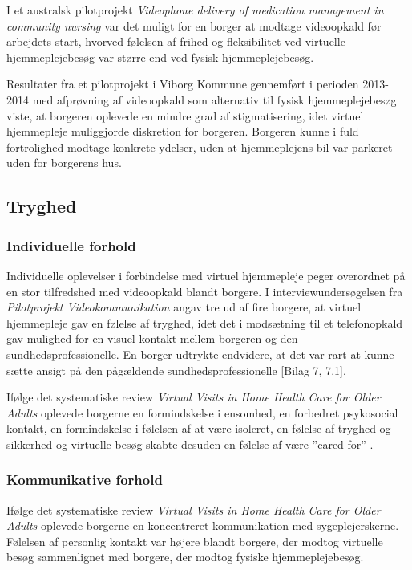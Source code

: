 I et australsk pilotprojekt \textit{Videophone delivery of medication management in community nursing} var det muligt for en borger at modtage videoopkald før arbejdets start, hvorved følelsen af frihed og fleksibilitet ved virtuelle hjemmeplejebesøg var større end ved fysisk hjemmeplejebesøg\cite{wade}.
 
Resultater fra et pilotprojekt i Viborg Kommune gennemført i perioden 2013-2014 med afprøvning af videoopkald som alternativ til fysisk hjemmeplejebesøg viste, at borgeren oplevede en mindre grad af stigmatisering, idet virtuel hjemmepleje muliggjorde diskretion for borgeren. Borgeren kunne i fuld fortrolighed modtage konkrete ydelser, uden at hjemmeplejens bil var parkeret uden for borgerens hus\cite{kandidat}.

\subsection{Tryghed}
\subsubsection{Individuelle forhold}
Individuelle oplevelser i forbindelse med virtuel hjemmepleje peger overordnet på en stor tilfredshed med videoopkald blandt borgere. I interviewundersøgelsen fra \textit{Pilotprojekt Videokommunikation} angav tre ud af fire borgere, at virtuel hjemmepleje gav en følelse af tryghed, idet det i modsætning til et telefonopkald gav mulighed for en visuel kontakt mellem borgeren og den sundhedsprofessionelle. En borger udtrykte endvidere, at det var rart at kunne sætte ansigt på den pågældende sundhedsprofessionelle [Bilag 7, 7.1].

Ifølge det systematiske review \textit{Virtual Visits in Home Health Care for Older Adults} oplevede borgerne en formindskelse i ensomhed, en forbedret psykosocial kontakt, en formindskelse i følelsen af at være isoleret, en følelse af tryghed og sikkerhed og virtuelle besøg skabte desuden en følelse af være ”cared for” \cite{Baf2}.  

\subsubsection{Kommunikative forhold}
Ifølge det systematiske review \textit{Virtual Visits in Home Health Care for Older Adults} oplevede borgerne en koncentreret kommunikation med sygeplejerskerne. Følelsen af personlig kontakt var højere blandt borgere, der modtog virtuelle besøg sammenlignet med borgere, der modtog fysiske hjemmeplejebesøg\cite{Baf2}. 

